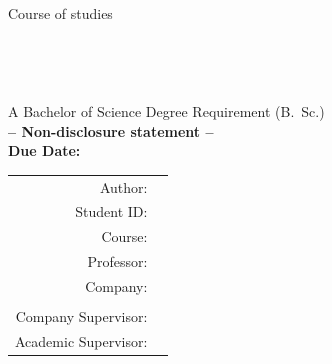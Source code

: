 \begin{titlepage}
\begin{center}
		\large{Course of studies}\\
		\large{\textbf{\courseofstudies}}\\
		\vspace{1.0cm}
		\huge{\textsc{\textbf{\mytitle}}}\\
		\Large{\textbf{\mysubtitle}}\\
		\vspace{1.0cm}
		\large{\textbf{\type}}\\
		\vspace{1.0cm}
		\normalsize{A Bachelor of Science Degree Requirement (B.~Sc.)}\\
		\vspace{1.0cm}
		\textbf{-- Non-disclosure statement --} \\
		\textbf{Due Date: \duedate} \\
		\vspace{2.0cm}
		\begin{tabular}{rl}
			Author:								& \myauthor \\
			Student ID:						& \matrikelnr \\
			Course: 							& \course \\ 
			Professor:						& \professor \\
			Company: 							& \company \\ \\
			Company Supervisor: 	& \companysupervisor \\
			Academic Supervisor:	& \supervisor \\
		\end{tabular} 
	\end{center}
\end{titlepage}